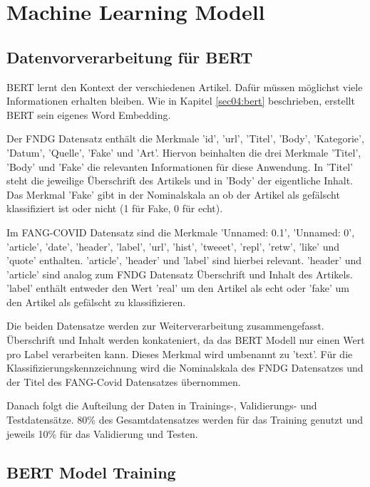\section{Machine Learning Modell} \label{sec:06:machine_learning_model}

\subsection{Datenvorverarbeitung für BERT}

BERT lernt den Kontext der verschiedenen Artikel. Dafür müssen möglichst viele Informationen erhalten bleiben. 
Wie in Kapitel \ref{sec04:bert} beschrieben, erstellt BERT sein eigenes Word Embedding.

Der FNDG Datensatz enthält die Merkmale 'id', 'url', 'Titel', 'Body', 'Kategorie', 'Datum', 'Quelle', 'Fake' und 'Art'.
Hiervon beinhalten die drei Merkmale 'Titel', 'Body' und 'Fake' die relevanten Informationen für diese Anwendung.
In 'Titel' steht die jeweilige Überschrift des Artikels und in 'Body' der eigentliche Inhalt. Das Merkmal 'Fake' gibt in der Nominalskala
an ob der Artikel als gefälscht klassifiziert ist oder nicht (1 für Fake, 0 für echt).

Im FANG-COVID Datensatz sind die Merkmale 'Unnamed: 0.1', 'Unnamed: 0', 'article', 'date', 'header', 'label', 'url', 'hist', 'tweeet', 'repl', 'retw', 'like' und 'quote'
enthalten. 'article', 'header' und 'label' sind hierbei relevant. 'header' und 'article' sind analog zum FNDG Datensatz Überschrift und Inhalt
des Artikels. 'label' enthält entweder den Wert 'real' um den Artikel als echt oder 'fake' um den Artikel als gefälscht zu klassifizieren.

Die beiden Datensatze werden zur Weiterverarbeitung zusammengefasst. Überschrift und Inhalt werden konkateniert, da das BERT Modell nur
einen Wert pro Label verarbeiten kann. Dieses Merkmal wird umbenannt zu 'text'. 
Für die Klassifizierungskennzeichnung wird die Nominalskala des FNDG Datensatzes und der Titel des FANG-Covid Datensatzes übernommen.

Danach folgt die Aufteilung der Daten in Trainings-, Validierungs- und Testdatensätze. 
80\% des Gesamtdatensatzes werden für das Training genutzt und jeweils 10\% für das Validierung und Testen.

\subsection{BERT Model Training}

